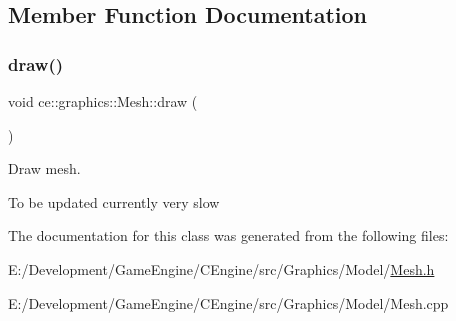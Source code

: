 \subsection{Member Function Documentation}
\mbox{\label{classce_1_1graphics_1_1_mesh_a4c056e83554a4face474bbc21d309910}} 
\subsubsection{\texorpdfstring{draw()}{draw()}}
{\footnotesize\ttfamily void ce\+::graphics\+::\+Mesh\+::draw (\begin{DoxyParamCaption}{ }\end{DoxyParamCaption})}



Draw mesh. 

To be updated currently very slow 

The documentation for this class was generated from the following files\+:\begin{DoxyCompactItemize}
\item 
E\+:/\+Development/\+Game\+Engine/\+C\+Engine/src/\+Graphics/\+Model/\hyperlink{_mesh_8h}{Mesh.\+h}\item 
E\+:/\+Development/\+Game\+Engine/\+C\+Engine/src/\+Graphics/\+Model/Mesh.\+cpp\end{DoxyCompactItemize}
